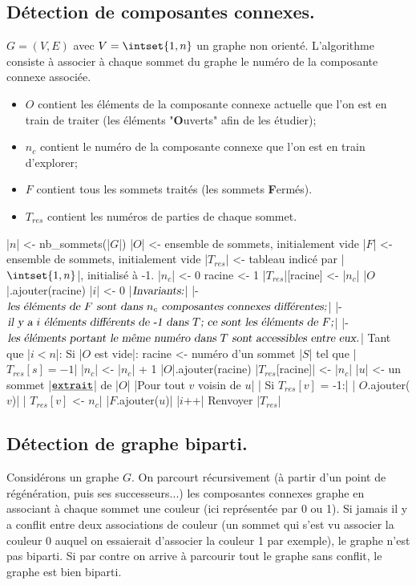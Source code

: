 \documentclass{scrartcl}
\begin{document}
		\subsection{Détection de composantes connexes.}
			$G = (V,E)$ avec $V = \intset{1,n}$ un graphe non orienté.
			L'algorithme consiste à associer à chaque sommet du graphe le numéro de la composante connexe associée.
			\begin{itemize}
				\item $O$ contient les éléments de la composante connexe actuelle que l'on est en train de traiter
					(les éléments "\textbf{O}uverts" afin de les étudier);
				\item $n_c$ contient le numéro de la composante connexe que l'on est en train d'explorer;
				\item $F$ contient tous les sommets traités (les sommets \textbf{F}ermés).
				\item $T_{res}$ contient les numéros de parties de chaque sommet.
			\end{itemize}
			\begin{algotext}
				|$n$| <- nb_sommets(|$G$|)
				|$O$| <- ensemble de sommets, initialement vide
				|$F$| <- ensemble de sommets, initialement vide
				|$T_{res}$| <- tableau indicé par |$\intset{1,n}$|, initialisé à -1.
				|$n_c$| <- 0 
				racine <- 1
				|$T_{res}$|[racine] <- |$n_c$|
				|$O$|.ajouter(racine)
				|$i$| <- 0
				|$\textsl{Invariants:}$|
					|- $ \textsl{les éléments de $F$ sont dans $n_c$ composantes connexes différentes;}$|
					|- $ \textsl{il y a $i$ éléments différents de -1 dans $T$; ce sont les éléments de $F$;}$|
					|- $ \textsl{les éléments portant le même numéro dans $T$ sont accessibles entre eux.}$|
				Tant que |$i < n$|:
					Si |$O$ est vide|:
						racine <- numéro d'un sommet |$S$| tel que |$T_{res}[s] = -1$|
						|$n_c$| <- |$n_c$| + 1
						|$O$|.ajouter(racine)
						|$T_{res}$[racine]| <- |$n_c$|
					|$u$| <- un sommet |$\texttt{\underline{extrait}}$| de |$O$|
					|Pour tout $v$ voisin de $u$|
					|	Si $T_{res}[v]$ = -1:|
					|		$O$.ajouter($v$)|
					|		$T_{res}[v]$ <- $n_c$|
					|$F$.ajouter($u$)|
					|$i$++|
				Renvoyer |$T_{res}$|
			\end{algotext}
		\subsection{Détection de graphe biparti.}
			 Considérons un graphe $G$.
			On parcourt récursivement (à partir d'un point de régénération, puis ses successeurs...)
			les composantes connexes graphe en associant à chaque sommet une couleur (ici représentée par 0 ou 1).
			Si jamais il y a conflit entre deux associations de couleur 
			(un sommet qui s'est vu associer la couleur 0 auquel on essaierait d'associer la couleur 1 par exemple),
			le graphe n'est pas biparti.
			Si par contre on arrive à parcourir tout le graphe sans conflit, le graphe est bien biparti.
\end{document}
